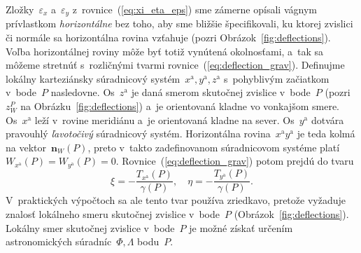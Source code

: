 \documentclass[a4paper, 12pt]{book}
\let\vec\mathbf
\begin{document}
Zložky~$\varepsilon_x$ a~$\varepsilon_y$ z~rovnice~(\ref{eq:xi_eta_eps}) sme 
zámerne opísali vágnym prívlastkom \emph{horizontálne} bez toho, aby sme 
bližšie špecifikovali, ku ktorej zvislici či normále sa horizontálna rovina 
vzťahuje (pozri Obrázok~\ref{fig:deflections}).  Voľba horizontálnej roviny 
môže byť totiž vynútená okolnosťami, a~tak sa môžeme stretnúť s~rozličnými 
tvarmi rovnice~(\ref{eq:deflection_grav}).  Definujme lokálny karteziánsky 
súradnicový systém~$x^\mathrm{a}, y^\mathrm{a}, z^\mathrm{a}$ s~pohyblivým 
začiatkom v~bode~$P$ nasledovne.  Os~$z^\mathrm{a}$ je daná smerom skutočnej 
zvislice v~bode~$P$ (pozri~$z_W^P$ na Obrázku~\ref{fig:deflections}) a~je 
orientovaná kladne vo vonkajšom smere.  Os~$x^\mathrm{a}$ leží v~rovine 
meridiánu a~je orientovaná kladne na sever.  Os~$y^\mathrm{a}$ dotvára 
pravouhlý \emph{ľavotočivý} súradnicový systém.  Horizontálna 
rovina~$x^\mathrm{a}y^\mathrm{a}$ je teda kolmá na vektor~$\vec n_W(P)$, preto 
v~takto zadefinovanom súradnicovom systéme platí $W_{x^\mathrm{a}}(P) 
= W_{y^\mathrm{a}}(P) = 0$.  Rovnice~(\ref{eq:deflection_grav}) potom prejdú do 
tvaru \parencite{Borre_chapter4}
%
\begin{equation}
\label{eq:deflection_grav_nat}
\xi = -\frac{T_{x^\mathrm{a}}(P)}{\gamma(P)}{,} \quad \eta 
= -\frac{T_{y^\mathrm{a}}(P)}{\gamma(P)}{.}
\end{equation}
%
V~praktických výpočtoch sa ale tento tvar používa zriedkavo, pretože vyžaduje 
znalosť lokálneho smeru skutočnej zvislice v~bode~$P$ 
(Obrázok~\ref{fig:deflections}).  Lokálny smer skutočnej zvislice v~bode~$P$ je 
možné získať určením astronomických súradníc~$\Phi, \Lambda$ bodu~$P$.
\end{document}

